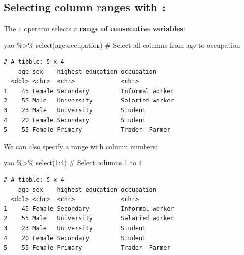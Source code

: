 \documentclass[
  letterpaper,
  DIV=11,
  numbers=noendperiod]{scrreprt}
\newenvironment{Shaded}{\begin{snugshade}}{\end{snugshade}}
\newcommand{\CommentTok}[1]{\textcolor[rgb]{0.37,0.37,0.37}{#1}}
\newcommand{\DecValTok}[1]{\textcolor[rgb]{0.68,0.00,0.00}{#1}}
\newcommand{\FunctionTok}[1]{\textcolor[rgb]{0.28,0.35,0.67}{#1}}
\newcommand{\NormalTok}[1]{\textcolor[rgb]{0.00,0.23,0.31}{#1}}
\newcommand{\SpecialCharTok}[1]{\textcolor[rgb]{0.37,0.37,0.37}{#1}}
\begin{document}
\subsection{\texorpdfstring{Selecting column ranges with
\texttt{:}}{Selecting column ranges with :}}\label{selecting-column-ranges-with}

The \texttt{:} operator selects a \textbf{range of consecutive
variables}:

\begin{Shaded}
\begin{Highlighting}[]
\NormalTok{yao }\SpecialCharTok{\%\textgreater{}\%} \FunctionTok{select}\NormalTok{(age}\SpecialCharTok{:}\NormalTok{occupation) }\CommentTok{\# Select all columns from \textasciigrave{}age\textasciigrave{} to \textasciigrave{}occupation\textasciigrave{}}
\end{Highlighting}
\end{Shaded}

\begin{verbatim}
# A tibble: 5 x 4
    age sex    highest_education occupation     
  <dbl> <chr>  <chr>             <chr>          
1    45 Female Secondary         Informal worker
2    55 Male   University        Salaried worker
3    23 Male   University        Student        
4    20 Female Secondary         Student        
5    55 Female Primary           Trader--Farmer 
\end{verbatim}

We can also specify a range with column numbers:

\begin{Shaded}
\begin{Highlighting}[]
\NormalTok{yao }\SpecialCharTok{\%\textgreater{}\%} \FunctionTok{select}\NormalTok{(}\DecValTok{1}\SpecialCharTok{:}\DecValTok{4}\NormalTok{) }\CommentTok{\# Select columns 1 to 4}
\end{Highlighting}
\end{Shaded}

\begin{verbatim}
# A tibble: 5 x 4
    age sex    highest_education occupation     
  <dbl> <chr>  <chr>             <chr>          
1    45 Female Secondary         Informal worker
2    55 Male   University        Salaried worker
3    23 Male   University        Student        
4    20 Female Secondary         Student        
5    55 Female Primary           Trader--Farmer 
\end{verbatim}
\end{document}
